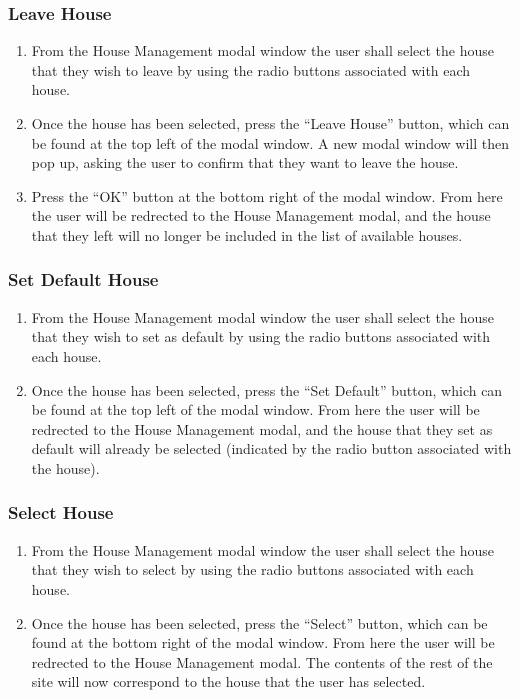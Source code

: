 \documentclass[12pt]{article}
\begin{document}
\subsubsection{Leave House}
\begin{enumerate}
\item From the House Management modal window the user shall select the house that they wish to leave by using the radio buttons associated with each house.
\item Once the house has been selected, press the ``Leave House'' button, which can be found at the top left of the modal window. A new modal window will then pop up, asking the user to confirm that they want to leave the house.
\item Press the ``OK'' button at the bottom right of the modal window. From here the user will be redrected to the House Management modal, and the house that they left will no longer be included in the list of available houses.
\end{enumerate}

\subsubsection{Set Default House}
\begin{enumerate}
\item From the House Management modal window the user shall select the house that they wish to set as default by using the radio buttons associated with each house.
\item Once the house has been selected, press the ``Set Default'' button, which can be found at the top left of the modal window. From here the user will be redrected to the House Management modal, and the house that they set as default will already be selected (indicated by the radio button associated with the house).
\end{enumerate}

\subsubsection{Select House}
\begin{enumerate}
\item From the House Management modal window the user shall select the house that they wish to select by using the radio buttons associated with each house.
\item Once the house has been selected, press the ``Select'' button, which can be found at the bottom right of the modal window. From here the user will be redrected to the House Management modal. The contents of the rest of the site will now correspond to the house that the user has selected.
\end{enumerate}
\end{document}
